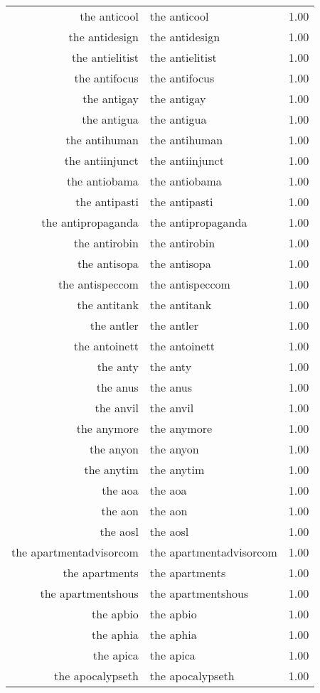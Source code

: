 \begin{table}[ht]
\begin{tabular}{rlr}
  the anticool & the anticool & 1.00 \\ 
  the antidesign & the antidesign & 1.00 \\ 
  the antielitist & the antielitist & 1.00 \\ 
  the antifocus & the antifocus & 1.00 \\ 
  the antigay & the antigay & 1.00 \\ 
  the antigua & the antigua & 1.00 \\ 
  the antihuman & the antihuman & 1.00 \\ 
  the antiinjunct & the antiinjunct & 1.00 \\ 
  the antiobama & the antiobama & 1.00 \\ 
  the antipasti & the antipasti & 1.00 \\ 
  the antipropaganda & the antipropaganda & 1.00 \\ 
  the antirobin & the antirobin & 1.00 \\ 
  the antisopa & the antisopa & 1.00 \\ 
  the antispeccom & the antispeccom & 1.00 \\ 
  the antitank & the antitank & 1.00 \\ 
  the antler & the antler & 1.00 \\ 
  the antoinett & the antoinett & 1.00 \\ 
  the anty & the anty & 1.00 \\ 
  the anus & the anus & 1.00 \\ 
  the anvil & the anvil & 1.00 \\ 
  the anymore & the anymore & 1.00 \\ 
  the anyon & the anyon & 1.00 \\ 
  the anytim & the anytim & 1.00 \\ 
  the aoa & the aoa & 1.00 \\ 
  the aon & the aon & 1.00 \\ 
  the aosl & the aosl & 1.00 \\ 
  the apartmentadvisorcom & the apartmentadvisorcom & 1.00 \\ 
  the apartments & the apartments & 1.00 \\ 
  the apartmentshous & the apartmentshous & 1.00 \\ 
  the apbio & the apbio & 1.00 \\ 
  the aphia & the aphia & 1.00 \\ 
  the apica & the apica & 1.00 \\ 
  the apocalypseth & the apocalypseth & 1.00 \\ 

\end{tabular}
\end{table}
